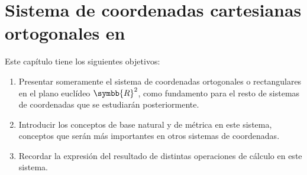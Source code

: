 %

\chapter{Sistema de coordenadas cartesianas ortogonales en
  }

Este capítulo tiene los siguientes objetivos:
\begin{enumerate}
\item Presentar someramente el sistema de coordenadas ortogonales o rectangulares en el
  plano euclídeo $\symbb{R}^2$, como fundamento para el resto de sistemas de coordenadas
  que se estudiarán posteriormente.
\item Introducir los conceptos de base natural y de métrica en este sistema, conceptos
  que serán más importantes en otros sistemas de coordenadas.
\item Recordar la expresión del resultado de distintas operaciones de cálculo en este
  sistema.
\end{enumerate}

